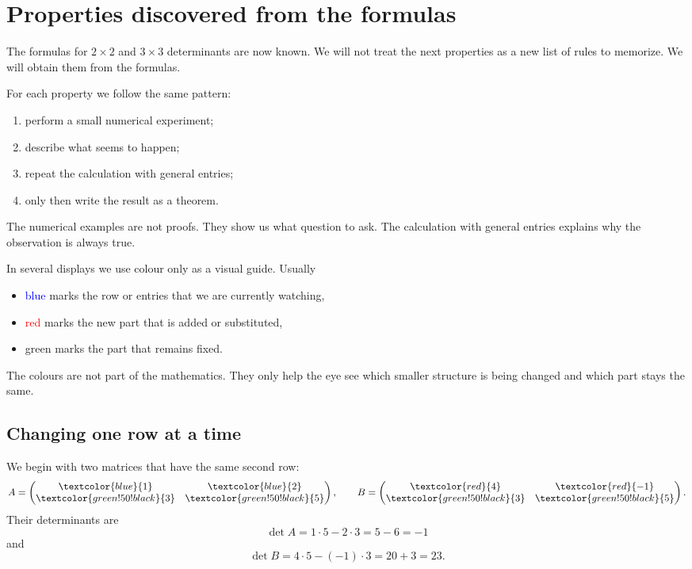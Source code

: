 \section{Properties discovered from the formulas}

The formulas for \(2\times2\) and \(3\times3\) determinants are now known. We will not treat the next properties as a new list of rules to memorize. We will obtain them from the formulas.

For each property we follow the same pattern:
\begin{enumerate}
\item perform a small numerical experiment;
\item describe what seems to happen;
\item repeat the calculation with general entries;
\item only then write the result as a theorem.
\end{enumerate}

The numerical examples are not proofs. They show us what question to ask. The calculation with general entries explains why the observation is always true.

\begin{remarkbox}
In several displays we use colour only as a visual guide. Usually
\begin{itemize}
\item \textcolor{blue}{blue} marks the row or entries that we are currently watching,
\item \textcolor{red}{red} marks the new part that is added or substituted,
\item \textcolor{green!50!black}{green} marks the part that remains fixed.
\end{itemize}
The colours are not part of the mathematics. They only help the eye see which smaller structure is being changed and which part stays the same.
\end{remarkbox}

\subsection{Changing one row at a time}

We begin with two matrices that have the same second row:
\[
A=
\begin{pmatrix}
\textcolor{blue}{1}&\textcolor{blue}{2}\\
\textcolor{green!50!black}{3}&\textcolor{green!50!black}{5}
\end{pmatrix},
\qquad
B=
\begin{pmatrix}
\textcolor{red}{4}&\textcolor{red}{-1}\\
\textcolor{green!50!black}{3}&\textcolor{green!50!black}{5}
\end{pmatrix}.
\]
Their determinants are
\[
\det A=1\cdot5-2\cdot3=5-6=-1
\]
and
\[
\det B=4\cdot5-(-1)\cdot3=20+3=23.
\]

